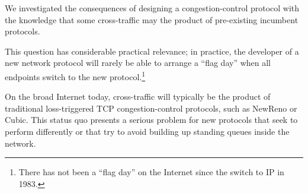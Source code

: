 \label{s:tcpaware}

We investigated the consequences of designing a congestion-control
protocol with the knowledge that some cross-traffic may the product of
pre-existing incumbent protocols.

This question has considerable practical relevance; in practice, the
developer of a new network protocol will rarely be able to arrange a
``flag day'' when all endpoints switch to the new
protocol.\footnote{There has not been a ``flag day'' on the Internet
  since the switch to IP in 1983.}

On the broad Internet today, cross-traffic will typically be the
product of traditional loss-triggered TCP congestion-control
protocols, such as NewReno or Cubic. This status quo presents a
serious problem for new protocols that seek to perform differently or
that try to avoid building up standing queues inside the network.

